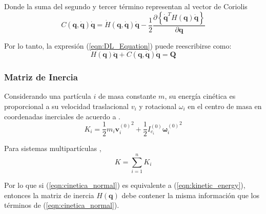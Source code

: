     Donde la suma del segundo y tercer término representan al vector de Coriolis
    \begin{equation}
        \label{eqn:coriolis_term}
        C(\boldsymbol{q}, \boldsymbol{\dot{q}}) \boldsymbol{\dot{q}} = \dot{H}(\boldsymbol{q}, \boldsymbol{{\dot{q}}}) \boldsymbol{{\dot{q}}}
        - \frac{1}{2} \frac{\partial \left \{ \boldsymbol{\dot{q}}^T H(\boldsymbol{q}) \boldsymbol{\dot{q}} \right \} }{\partial \boldsymbol{q}}
    \end{equation} 

    Por lo tanto, la expresión (\ref{eqn:DL_Equation}) puede reescribirse como:
    \begin{equation}
        \label{eqn:DL_vectors}
        H(\boldsymbol{q}) \boldsymbol{\ddot{q}} + C(\boldsymbol{q}, \boldsymbol{\dot{q}}) \boldsymbol{\dot{q}} = \boldsymbol{Q}
    \end{equation}
    
    \subsubsection{Matriz de Inercia}
    \noindent Considerando una partícula $i$ de masa constante $m$, su energía cinética es proporcional a su velocidad traslacional $v_i$ 
    y rotacional $\omega_i$ en el centro de masa en coordenadas inerciales de acuerdo a \cite{theoretical_minimun}.
    \begin{equation}
        \label{eqn:cinetica_normal}
         K_i = \frac{1}{2} m_i {\boldsymbol{v}_i^{(0)}}^2 + \frac{1}{2} I_{c_i}^{(0)} {\boldsymbol{\omega}_i^{(0)}}^2 
    \end{equation}

    Para sistemas multipartículas \cite{rigid_multibody}, 
    \begin{equation}
        \label{eqn:cinetica_multi}
         K = \sum_{i=1}^n K_i
    \end{equation}

    Por lo que si (\ref{eqn:cinetica_normal}) es equivalente a (\ref{eqn:kinetic_energy}), entonces la matriz de inercia $H(\boldsymbol{q})$ debe 
    contener la misma información que los términos de (\ref{eqn:cinetica_normal}). 
    
